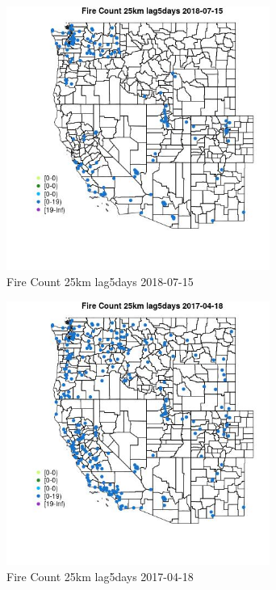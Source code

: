 \begin{figure} 
\centering  
\includegraphics[width=0.77\textwidth]{Code_Outputs/Report_ML_input_PM25_Step4_part_e_de_duplicated_aves_compiled_2019-05-21wNAs_MapObsFire_Count_25km_lag5days2018-07-15.jpg} 
\caption{\label{fig:Report_ML_input_PM25_Step4_part_e_de_duplicated_aves_compiled_2019-05-21wNAsMapObsFire_Count_25km_lag5days2018-07-15}Fire Count 25km lag5days 2018-07-15} 
\end{figure} 
 

\begin{figure} 
\centering  
\includegraphics[width=0.77\textwidth]{Code_Outputs/Report_ML_input_PM25_Step4_part_e_de_duplicated_aves_compiled_2019-05-21wNAs_MapObsFire_Count_25km_lag5days2017-04-18.jpg} 
\caption{\label{fig:Report_ML_input_PM25_Step4_part_e_de_duplicated_aves_compiled_2019-05-21wNAsMapObsFire_Count_25km_lag5days2017-04-18}Fire Count 25km lag5days 2017-04-18} 
\end{figure} 
 

